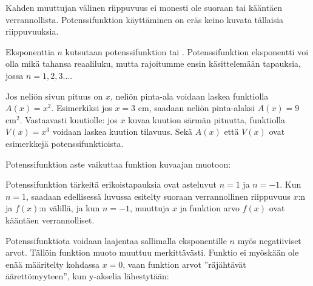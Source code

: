 Kahden muuttujan välinen riippuvuus ei monesti ole suoraan tai kääntäen verrannollista.
Potenssifunktion käyttäminen on eräs keino kuvata tällaisia riippuvuuksia.


Eksponenttia $n$ kutsutaan potenssifunktion 
tai .
Potenssifunktion eksponentti voi olla mikä tahansa reaaliluku, mutta
rajoitumme ensin käsittelemään tapauksia, jossa $n = 1, 2, 3\ldots $.

\begin{esimerkki}
Jos neliön sivun pituus on $x$, neliön pinta-ala voidaan laskea
funktiolla $A(x)=x^2$.
Esimerkiksi jos $x = 3$ cm, saadaan neliön pinta-alaksi $A(x) = 9$ cm$^2$.
Vastaavasti kuutiolle: jos $x$ kuvaa kuution särmän pituutta, funktiolla
$V(x)=x^3$ voidaan laskea kuution tilavuus. Sekä $A(x)$ että $V(x)$ ovat
esimerkkejä potenssifunktioista.
\end{esimerkki}

Potenssifunktion aste vaikuttaa funktion kuvaajan muotoon:
\begin{alakohdat}
\end{alakohdat}

\begin{center}
\begin{kuvaajapohja}{0.5}{-6}{6}{-6}{6}
\end{kuvaajapohja}
\end{center}
Potenssifunktion tärkeitä erikoistapauksia ovat asteluvut $n = 1$ ja $n = -1$.
Kun $n = 1$, saadaan edellisessä luvussa esitelty suoraan verrannollinen
riippuvuus $x$:n ja $f(x)$:n välillä, ja kun $n = -1$, muuttuja $x$ ja
funktion arvo $f(x)$ ovat kääntäen verrannolliset.

Potenssifunktiota voidaan laajentaa sallimalla eksponentille $n$
myös negatiiviset arvot.
Tällöin funktion muoto muuttuu merkittävästi. Funktio ei myöskään ole
enää määritelty kohdassa $x = 0$, vaan funktion arvot
''räjähtävät äärettömyyteen'', kun y-akselia lähestytään:

